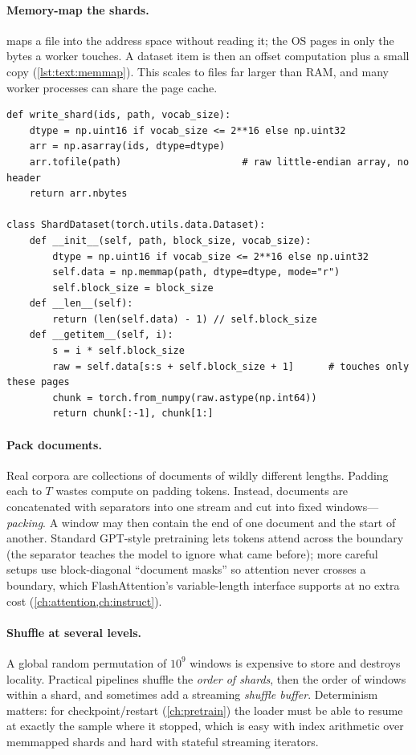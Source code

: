 \paragraph{Memory-map the shards.}  maps a file into the address space without
reading it; the OS pages in only the bytes a worker touches. A dataset item is then an offset
computation plus a small copy (\cref{lst:text:memmap}). This scales to files far larger than RAM, and
many worker processes can share the page cache.

\begin{lstlisting}[caption={Writing and reading a token shard (Lab 3, Part D).},label={lst:text:memmap}]
def write_shard(ids, path, vocab_size):
    dtype = np.uint16 if vocab_size <= 2**16 else np.uint32
    arr = np.asarray(ids, dtype=dtype)
    arr.tofile(path)                     # raw little-endian array, no header
    return arr.nbytes

class ShardDataset(torch.utils.data.Dataset):
    def __init__(self, path, block_size, vocab_size):
        dtype = np.uint16 if vocab_size <= 2**16 else np.uint32
        self.data = np.memmap(path, dtype=dtype, mode="r")
        self.block_size = block_size
    def __len__(self):
        return (len(self.data) - 1) // self.block_size
    def __getitem__(self, i):
        s = i * self.block_size
        raw = self.data[s:s + self.block_size + 1]      # touches only these pages
        chunk = torch.from_numpy(raw.astype(np.int64))
        return chunk[:-1], chunk[1:]
\end{lstlisting}

\paragraph{Pack documents.} Real corpora are collections of documents of wildly different lengths.
Padding each to $T$ wastes compute on padding tokens. Instead, documents are concatenated with
 separators into one stream and cut into fixed windows---\emph{packing}. A window
may then contain the end of one document and the start of another. Standard GPT-style pretraining
lets tokens attend across the boundary (the separator teaches the model to ignore what came
before); more careful setups use block-diagonal ``document masks'' so attention never crosses a
boundary, which FlashAttention's variable-length interface supports at no extra cost
(\cref{ch:attention,ch:instruct}).

\paragraph{Shuffle at several levels.} A global random permutation of $10^{9}$ windows is expensive to
store and destroys locality. Practical pipelines shuffle the \emph{order of shards}, then the order of
windows within a shard, and sometimes add a streaming \emph{shuffle buffer}. Determinism matters:
for checkpoint/restart (\cref{ch:pretrain}) the loader must be able to resume at exactly the sample
where it stopped, which is easy with index arithmetic over memmapped shards and hard with
stateful streaming iterators.

